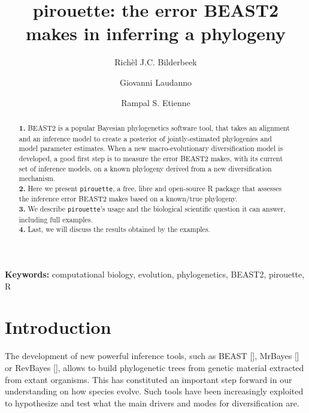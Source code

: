 \documentclass{article}
\title{pirouette: the error BEAST2 makes in inferring a phylogeny}
\author[1]{Rich\`el J.C. Bilderbeek}
\author[1]{Giovanni Laudanno}
\author[1]{Rampal S. Etienne}
\affil[1]{Groningen Institute for Evolutionary Life Sciences, University of Groningen, Groningen, The Netherlands}
\begin{document}
\maketitle

\begin{abstract}

  \textbf{1. }
    BEAST2 is a popular Bayesian phylogenetics software tool,
    that takes an alignment and an inference model to create a
    posterior of jointly-estimated phylogenies and model parameter estimates.
    When a new macro-evolutionary diversification model is developed,
    a good first step is to measure the error BEAST2 makes, with its current set of inference models, on a known
    phylogeny derived from a new diversification mechanism. \\
  \textbf{2. }
    Here we present \verb;pirouette;, 
    a free, libre and open-source R package that assesses 
    the inference error BEAST2 makes based on a known/true 
    phylogeny. \\
  \textbf{3. }
    We describe \verb;pirouette;'s usage and the biological scientific
    question it can answer, including full examples. \\
  \textbf{4. }
    Last, we will discuss the results obtained by the examples. \\
\end{abstract}

{\bf Keywords:} computational biology, evolution, phylogenetics, BEAST2, pirouette, R

\section{Introduction}

The development of new powerful inference tools, 
such as BEAST [\cite{drummond2007beast}], 
MrBayes [\cite{huelsenbeck2001mrbayes}]
or RevBayes [\cite{hohna2016revbayes}], 
allows to build phylogenetic trees 
from genetic material extracted from extant organisms.
This has constituted an important step forward 
in our understanding on how species evolve.
Such tools have been increasingly exploited to hypothesize 
and test what the main drivers and modes for diversification are.
\end{document}
